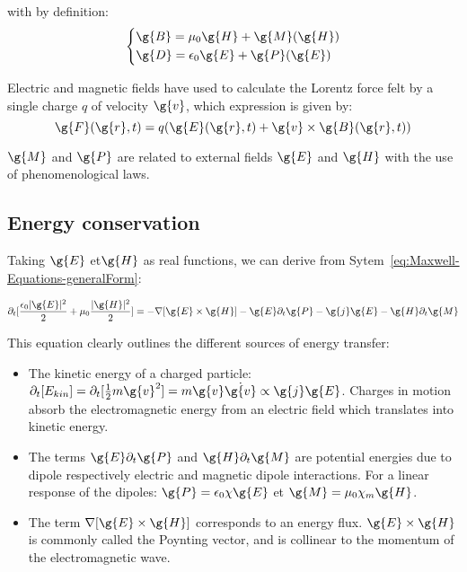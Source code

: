 \noindent with by definition: 
\begin{equation}
  \left\{
      \begin{aligned}
     &\g{B} = \mu_0 \g{H} + \g{M}(\g{H}) \\
     &\g{D} = \epsilon_0 \g{E} +  \g{P}(\g{E})\\
      \end{aligned}
    \right.
\end{equation}

\noindent Electric and magnetic fields have used to calculate the Lorentz force felt by a single charge $q$ of velocity $\g{v}$, which expression is given by: 
$$
\g{F}(\g{r},t) = q (\g{E}(\g{r},t) + \g{v}\times \g{B}(\g{r},t))
$$


\noindent $\g{M}$ and $\g{P}$ are related to external fields $\g{E}$ and $\g{H}$ with the use of phenomenological laws. 

\subsection{Energy conservation}

\noindent Taking $\g{E}$ et$\g{H}$ as real functions, we can derive from Sytem~\ref{eq:Maxwell-Equations-generalForm}: 

\begin{equation}
\partial_t[\frac{\epsilon_0|\g{E}|^2}{2} + \mu_0\frac{|\g{H}|^2}{2}] = -\nabla[\g{E}\times\g{H}] - \g{E}\partial_t\g{P} - \g{j}\g{E} - \g{H}\partial_t \g{M}
\end{equation}

\noindent This equation clearly outlines the different sources of energy transfer: 

\begin{itemize}
\item The kinetic energy of a charged particle: $\partial_t [E_{kin}] = \partial_t [\frac{1}{2}m\g{v}^2] = m\g{v}\dot{\g{v}}  \propto \g{j}\g{E}$. Charges in motion absorb the electromagnetic energy from an electric field which translates into kinetic energy. 
\item The terms $\g{E}\partial_t\g{P}$ and $\g{H}\partial_t \g{M}$ are potential energies due to dipole respectively electric and magnetic dipole interactions. For a  linear response of the dipoles: $\g{P} = \epsilon_0\chi \g{E}$ et $\g{M} = \mu_0 \chi_m \g{H}$. 
\item The term $\nabla [\g{E}\times \g{H}]$ corresponds to an energy flux. $\g{E}\times \g{H}$ is commonly called the Poynting vector, and is collinear to the momentum of the electromagnetic wave.
\end{itemize}


